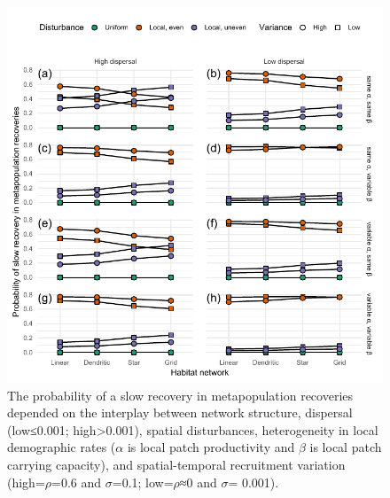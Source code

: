 \documentclass[
]{article}
\begin{document}
\begin{figure}[H]

{\centering \includegraphics{Managing_for_ecological_surprises_in_metapopulations_files/figure-latex/conditional probability for slow recovery-1} 

}

\caption{The probability of a slow recovery in metapopulation recoveries depended on the interplay between network structure, dispersal (low≤0.001; high>0.001), spatial disturbances, heterogeneity in local demographic rates ($\alpha$ is local patch productivity and $\beta$ is local patch carrying capacity), and spatial-temporal recruitment variation (high=$\rho$=0.6 and $\sigma$=0.1; low=$\rho$≈0 and $\sigma$= 0.001).}\label{fig:conditional probability for slow recovery}
\end{figure}
\end{document}
